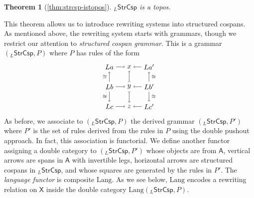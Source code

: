\documentclass{amsart}
\newcommand{\iso}{\cong}
\newcommand{\A}{\cat{A}}
\newcommand{\X}{\cat{X}}
\newcommand{\StrCsp}{\cat{StrCsp}}
\newcommand{\Lang}{\mathrm{Lang}}
\newcommand{\cat}[1]{\mathsf{#1}}
\newtheorem*{theorem*}{Theorem}
\theoremstyle{remark}
\theoremstyle{definition}
\begin{document}
\begin{theorem*}[\ref{thm:strcsp-istopos}]
  $ _{L}\StrCsp $ is a topos.
\end{theorem*}

This theorem allows us to introduce rewriting systems into
structured cospans.  As mentioned above, the rewriting
system starts with grammars, though we restrict our
attention to \emph{structured cospan grammar}.  This is a
grammar $ ( _{L}\StrCsp , P ) $ where $ P $ has rules of the
form
%
 \[
   \begin{tikzpicture}
    \begin{scope}
        \node (1) at (0,2) {\( La \)};
        \node (2) at (1,2) {\( x \)};
        \node (3) at (2,2) {\( La' \)};
        \node (4) at (0,1) {\( Lb \)};
        \node (5) at (1,1) {\( y \)};
        \node (6) at (2,1) {\( Lb' \)};
        \node (7) at (0,0) {\( Lc \)};
        \node (8) at (1,0) {\( z \)};
        \node (9) at (2,0) {\( Lc' \)};
        \draw [->] (1) to node []
          {\scriptsize{\( \)}} (2);
        \draw [->] (3) to node []
          {\scriptsize{\( \)}} (2);
        \draw [->] (4) to node []
          {\scriptsize{\( \)}} (5);
        \draw [->] (6) to node []
          {\scriptsize{\( \)}} (5);
        \draw [->] (7) to node []
          {\scriptsize{\( \)}} (8);
        \draw [->] (9) to node []
          {\scriptsize{\( \)}} (8);
        \draw [->] (4) to node [left]
          {\scriptsize{\( \iso \)}} (1);
        \draw [->] (4) to node [left]
          {\scriptsize{\( \iso \)}} (7);
        \draw [>->] (5) to node []
          {\scriptsize{\( \)}} (2);
        \draw [>->] (5) to node []
          {\scriptsize{\( \)}} (8);
        \draw [->] (6) to node [right]
          {\scriptsize{\( \iso \)}} (3);
        \draw [->] (6) to node [right]
          {\scriptsize{\( \iso \)}} (9);
    \end{scope}
  \end{tikzpicture}
\]
%
As before, we associate to $ ( _{L}\StrCsp , P ) $ the
derived grammar $ ( _{L}\StrCsp , P' ) $ where $ P' $ is the
set of rules derived from the rules in $ P $ using the
double pushout approach.  In fact, this association is
functorial.  We define another functor assigning a double
category to $ ( _{L}\StrCsp , P' ) $ whose objects are from
$ \A $, vertical arrows are spans in $ \A $ with invertible
legs, horizontal arrows are structured cospans in
$ _{L}\StrCsp $, and whose squares are generated by the
rules in $ P' $. The \emph{language functor} is composite
$ \Lang $.  As we see below, $ \Lang $ encodes a rewriting
relation on $ \X $ inside the double category
$ \Lang ( _{L}\StrCsp , P ) $.
\end{document}
